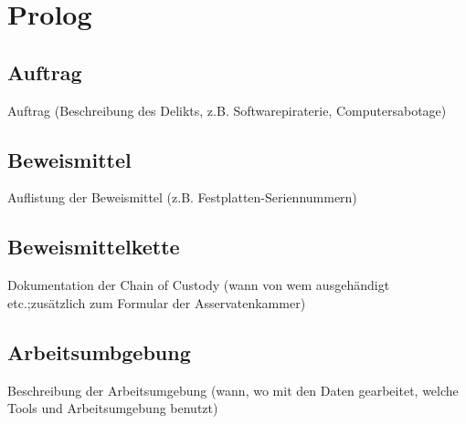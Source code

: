 \chapter{Prolog}
\label{sec:prolog}

\section{Auftrag}
\label{sec:auftrag}
Auftrag (Beschreibung des Delikts, z.B. Softwarepiraterie, Computersabotage)

\section{Beweismittel}
\label{sec:beweismittel}
Auflistung der Beweismittel (z.B. Festplatten-Seriennummern)

\section{Beweismittelkette}
\label{sec:beweismittelkette}
Dokumentation der Chain of Custody (wann von wem ausgehändigt etc.;zusätzlich zum Formular der Asservatenkammer)

\section{Arbeitsumbgebung}
\label{sec:arbeitsumgebung}
Beschreibung der Arbeitsumgebung (wann, wo mit den Daten gearbeitet, welche Tools und Arbeitsumgebung benutzt)
